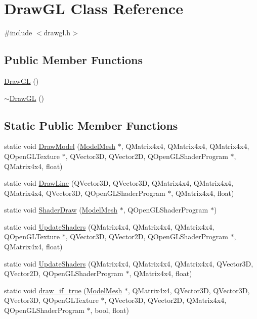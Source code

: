 \hypertarget{class_draw_g_l}{}\section{Draw\+G\+L Class Reference}
\label{class_draw_g_l}


{\ttfamily \#include $<$drawgl.\+h$>$}

\subsection*{Public Member Functions}
\begin{DoxyCompactItemize}
\item 
\hyperlink{class_draw_g_l_ae3916bb52ce05c74ede60c6427a9b01e}{Draw\+G\+L} ()
\item 
\hyperlink{class_draw_g_l_a46bf532124a86efdac0873841e0f9722}{$\sim$\+Draw\+G\+L} ()
\end{DoxyCompactItemize}
\subsection*{Static Public Member Functions}
\begin{DoxyCompactItemize}
\item 
static void \hyperlink{class_draw_g_l_af4a83656e95f4c5b3410af0e77ed0d7d}{Draw\+Model} (\hyperlink{class_model_mesh}{Model\+Mesh} $\ast$, Q\+Matrix4x4, Q\+Matrix4x4, Q\+Matrix4x4, Q\+Open\+G\+L\+Texture $\ast$, Q\+Vector3\+D, Q\+Vector2\+D, Q\+Open\+G\+L\+Shader\+Program $\ast$, Q\+Matrix4x4, float)
\item 
static void \hyperlink{class_draw_g_l_a28b3b9eb6f8017639219e394bba0f444}{Draw\+Line} (Q\+Vector3\+D, Q\+Vector3\+D, Q\+Matrix4x4, Q\+Matrix4x4, Q\+Matrix4x4, Q\+Vector3\+D, Q\+Open\+G\+L\+Shader\+Program $\ast$, Q\+Matrix4x4, float)
\item 
static void \hyperlink{class_draw_g_l_aa89de07efb7cf022819b46e4f74946c7}{Shader\+Draw} (\hyperlink{class_model_mesh}{Model\+Mesh} $\ast$, Q\+Open\+G\+L\+Shader\+Program $\ast$)
\item 
static void \hyperlink{class_draw_g_l_aff6e54f6cf2e53c6ab76cb32214aef08}{Update\+Shaders} (Q\+Matrix4x4, Q\+Matrix4x4, Q\+Matrix4x4, Q\+Open\+G\+L\+Texture $\ast$, Q\+Vector3\+D, Q\+Vector2\+D, Q\+Open\+G\+L\+Shader\+Program $\ast$, Q\+Matrix4x4, float)
\item 
static void \hyperlink{class_draw_g_l_ad77e7619440eab7ad7ee9fb0350ecb1f}{Update\+Shaders} (Q\+Matrix4x4, Q\+Matrix4x4, Q\+Matrix4x4, Q\+Vector3\+D, Q\+Vector2\+D, Q\+Open\+G\+L\+Shader\+Program $\ast$, Q\+Matrix4x4, float)
\item 
static void \hyperlink{class_draw_g_l_a314f5c1bffed9c92cb85adf904e64901}{draw\+\_\+if\+\_\+true} (\hyperlink{class_model_mesh}{Model\+Mesh} $\ast$, Q\+Matrix4x4, Q\+Vector3\+D, Q\+Vector3\+D, Q\+Vector3\+D, Q\+Open\+G\+L\+Texture $\ast$, Q\+Vector3\+D, Q\+Vector2\+D, Q\+Matrix4x4, Q\+Open\+G\+L\+Shader\+Program $\ast$, bool, float)
\end{DoxyCompactItemize}


